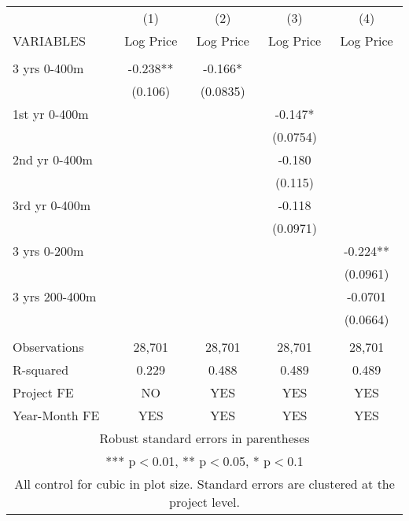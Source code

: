 \begin{tabular}{lcccc} \hline
 & (1) & (2) & (3) & (4) \\
VARIABLES & Log Price & Log Price & Log Price & Log Price \\ \hline
 &  &  &  &  \\
3 yrs 0-400m & -0.238** & -0.166* &  &  \\
 & (0.106) & (0.0835) &  &  \\
1st yr 0-400m &  &  & -0.147* &  \\
 &  &  & (0.0754) &  \\
2nd yr 0-400m &  &  & -0.180 &  \\
 &  &  & (0.115) &  \\
3rd yr 0-400m &  &  & -0.118 &  \\
 &  &  & (0.0971) &  \\
3 yrs 0-200m &  &  &  & -0.224** \\
 &  &  &  & (0.0961) \\
3 yrs 200-400m &  &  &  & -0.0701 \\
 &  &  &  & (0.0664) \\
 &  &  &  &  \\
Observations & 28,701 & 28,701 & 28,701 & 28,701 \\
R-squared & 0.229 & 0.488 & 0.489 & 0.489 \\
Project FE & NO & YES & YES & YES \\
 Year-Month FE & YES & YES & YES & YES \\ \hline
\multicolumn{5}{c}{ Robust standard errors in parentheses} \\
\multicolumn{5}{c}{ *** p$<$0.01, ** p$<$0.05, * p$<$0.1} \\
\multicolumn{5}{c}{ All control for cubic in plot size. Standard errors are clustered at the project level.} \\
\end{tabular}

